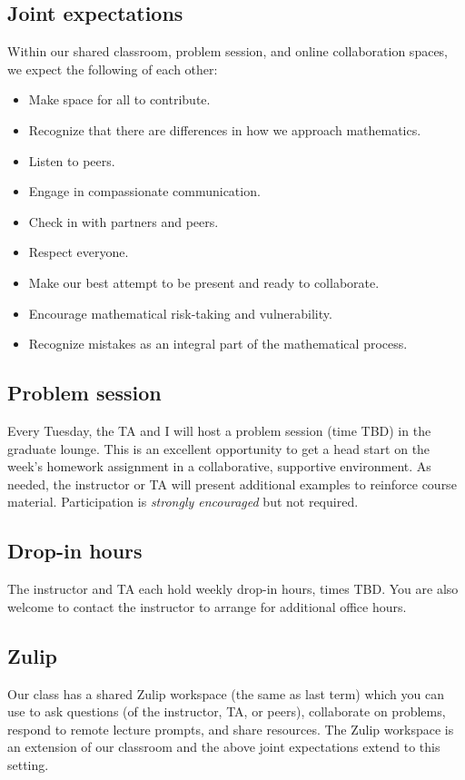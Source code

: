 \documentclass[11pt,twoside]{amsart}
\begin{document}
\subsection*{Joint expectations}
Within our shared classroom, problem session, and online collaboration spaces, we expect the following of each other:
\begin{itemize}
\item Make space for all to contribute.
\item Recognize that there are differences in how we approach mathematics.
\item Listen to peers.
\item Engage in compassionate communication.
\item Check in with partners and peers.
\item Respect everyone.
\item Make our best attempt to be present and ready to collaborate.
\item Encourage mathematical risk-taking and vulnerability.
\item Recognize mistakes as an integral part of the mathematical process.
\end{itemize}

\subsection*{Problem session}
Every Tuesday, the TA and I will host a problem session (time TBD) in the graduate lounge. This is an excellent opportunity to get a head start on the week's homework assignment in a collaborative, supportive environment. As needed, the instructor or TA will present additional examples to reinforce course material. Participation is \emph{strongly encouraged} but not required.

\subsection*{Drop-in hours}
The instructor and TA each hold weekly drop-in hours, times TBD. You are also welcome to contact the instructor to arrange for additional office hours.

\subsection*{Zulip}
Our class has a shared Zulip workspace (the same as last term) which you can use to ask questions (of the instructor, TA, or peers), collaborate on problems, respond to remote lecture prompts, and share resources. The Zulip workspace is an extension of our classroom and the above joint expectations extend to this setting.
\end{document}
